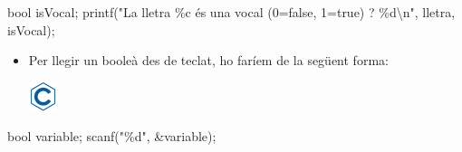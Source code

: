 \documentclass[
]{book}
\newenvironment{Shaded}{\begin{snugshade}}{\end{snugshade}}
\newcommand{\DataTypeTok}[1]{\textcolor[rgb]{0.13,0.29,0.53}{#1}}
\newcommand{\NormalTok}[1]{#1}
\newcommand{\SpecialCharTok}[1]{\textcolor[rgb]{0.00,0.00,0.00}{#1}}
\newcommand{\StringTok}[1]{\textcolor[rgb]{0.31,0.60,0.02}{#1}}
\providecommand{\tightlist}{%
  \setlength{\itemsep}{0pt}\setlength{\parskip}{0pt}}
\begin{document}
\begin{Shaded}
\begin{Highlighting}[]
\DataTypeTok{bool}\NormalTok{ isVocal;}
\NormalTok{printf(}\StringTok{"La lletra \%c és una vocal (0=false, 1=true) ? \%d}\SpecialCharTok{\textbackslash{}n}\StringTok{"}\NormalTok{, lletra, isVocal);}
\end{Highlighting}
\end{Shaded}

\begin{itemize}
\tightlist
\item
  Per llegir un booleà des de teclat, ho faríem de la següent forma:

  \includegraphics{./img/c.png}
\end{itemize}

\begin{Shaded}
\begin{Highlighting}[]
\DataTypeTok{bool}\NormalTok{ variable;}
\NormalTok{scanf(}\StringTok{"\%d"}\NormalTok{, \&variable);}
\end{Highlighting}
\end{Shaded}
\end{document}
